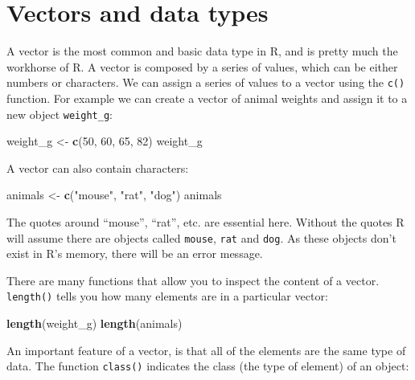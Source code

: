 \documentclass[]{book}
\newenvironment{Shaded}{\begin{snugshade}}{\end{snugshade}}
\newcommand{\KeywordTok}[1]{\textcolor[rgb]{0.13,0.29,0.53}{\textbf{#1}}}
\newcommand{\DecValTok}[1]{\textcolor[rgb]{0.00,0.00,0.81}{#1}}
\newcommand{\StringTok}[1]{\textcolor[rgb]{0.31,0.60,0.02}{#1}}
\newcommand{\NormalTok}[1]{#1}
\theoremstyle{definition}
\theoremstyle{definition}
\theoremstyle{remark}
\begin{document}
\section{Vectors and data types}\label{vectors-and-data-types}

A vector is the most common and basic data type in R, and is pretty much
the workhorse of R. A vector is composed by a series of values, which
can be either numbers or characters. We can assign a series of values to
a vector using the \texttt{c()} function. For example we can create a
vector of animal weights and assign it to a new object
\texttt{weight\_g}:

\begin{Shaded}
\begin{Highlighting}[]
\NormalTok{weight_g <-}\StringTok{ }\KeywordTok{c}\NormalTok{(}\DecValTok{50}\NormalTok{, }\DecValTok{60}\NormalTok{, }\DecValTok{65}\NormalTok{, }\DecValTok{82}\NormalTok{)}
\NormalTok{weight_g}
\end{Highlighting}
\end{Shaded}

A vector can also contain characters:

\begin{Shaded}
\begin{Highlighting}[]
\NormalTok{animals <-}\StringTok{ }\KeywordTok{c}\NormalTok{(}\StringTok{"mouse"}\NormalTok{, }\StringTok{"rat"}\NormalTok{, }\StringTok{"dog"}\NormalTok{)}
\NormalTok{animals}
\end{Highlighting}
\end{Shaded}

The quotes around ``mouse'', ``rat'', etc. are essential here. Without
the quotes R will assume there are objects called \texttt{mouse},
\texttt{rat} and \texttt{dog}. As these objects don't exist in R's
memory, there will be an error message.

There are many functions that allow you to inspect the content of a
vector. \texttt{length()} tells you how many elements are in a
particular vector:

\begin{Shaded}
\begin{Highlighting}[]
\KeywordTok{length}\NormalTok{(weight_g)}
\KeywordTok{length}\NormalTok{(animals)}
\end{Highlighting}
\end{Shaded}

An important feature of a vector, is that all of the elements are the
same type of data. The function \texttt{class()} indicates the class
(the type of element) of an object:
\end{document}
